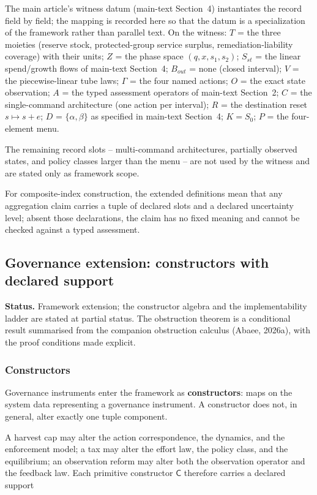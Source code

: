The main article's witness datum (main-text Section~4) instantiates the record field by field; the mapping is recorded here so that the datum is a specialization of the framework rather than parallel text. On the witness: $T$ = the three moieties (reserve stock, protected-group service surplus, remediation-liability coverage) with their units; $Z$ = the phase space $(q, x, s_1, s_2)$; $S_{st}$ = the linear spend/growth flows of main-text Section~4; $B_{out}$ = none (closed interval); $V$ = the piecewise-linear tube laws; $\Gamma$ = the four named actions; $O$ = the exact state observation; $A$ = the typed assessment operators of main-text Section~2; $C$ = the single-command architecture (one action per interval); $R$ = the destination reset $s \mapsto s + e$; $D$ = $\{\alpha, \beta\}$ as specified in main-text Section~4; $K = S_0$; $P$ = the four-element menu.

The remaining record slots -- multi-command architectures, partially observed states, and policy classes larger than the menu -- are not used by the witness and are stated only as framework scope.

For composite-index construction, the extended definitions mean that any aggregation claim carries a tuple of declared slots and a declared uncertainty level; absent those declarations, the claim has no fixed meaning and cannot be checked against a typed assessment.

\subsection{Governance extension: constructors with declared support}

\noindent\textbf{Status.} Framework extension; the constructor algebra and the implementability ladder are stated at partial status. The obstruction theorem is a conditional result summarised from the companion obstruction calculus (Abaee, 2026a), with the proof conditions made explicit.

\subsubsection{Constructors}

Governance instruments enter the framework as \textbf{constructors}: maps on the system data representing a governance instrument. A constructor does not, in general, alter exactly one tuple component.

A harvest cap may alter the action correspondence, the dynamics, and the enforcement model; a tax may alter the effort law, the policy class, and the equilibrium; an observation reform may alter both the observation operator and the feedback law. Each primitive constructor $\mathsf{C}$ therefore carries a declared support


